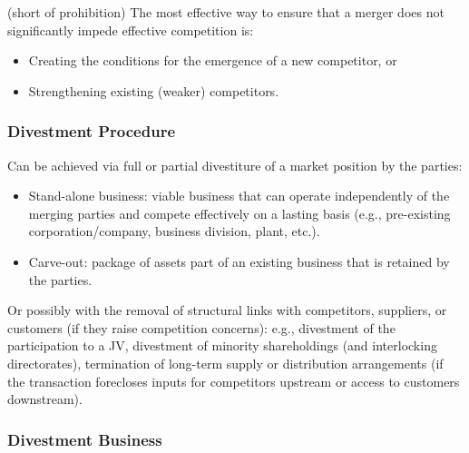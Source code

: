             (short of prohibition) The most effective way to ensure that a merger does not significantly impede effective competition is:
            \begin{itemize}
                \item Creating the conditions for the emergence of a new competitor, or
            
                \item Strengthening existing (weaker) competitors.
            \end{itemize}

\newpage
        \subsubsection{Divestment Procedure}

            Can be achieved via full or partial divestiture of a market position by the parties:
            \begin{itemize}
                \item Stand-alone business: viable business that can operate independently of the merging parties and compete effectively on a lasting basis (e.g., pre-existing corporation/company, business division, plant, etc.).
                \item Carve-out: package of assets part of an existing business that is retained by the parties.
            \end{itemize}

            
            Or possibly with the removal of structural links with competitors, suppliers, or customers (if they raise competition concerns): e.g., divestment of the participation to a JV, divestment of minority shareholdings (and interlocking directorates), termination of long-term supply or distribution arrangements (if the transaction forecloses inputs for competitors upstream or access to customers downstream).

        \subsubsection{Divestment Business}

